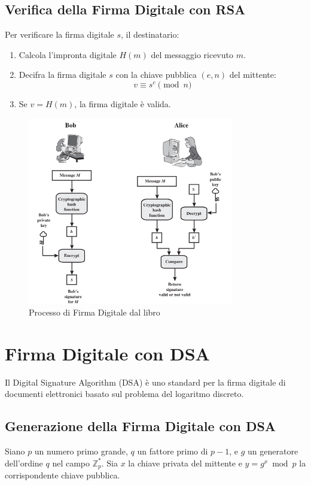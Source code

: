 \documentclass[a4paper,12pt]{report}
\begin{document}
\subsection{Verifica della Firma Digitale con RSA}
Per verificare la firma digitale $s$, il destinatario:

\begin{enumerate}
    \item Calcola l'impronta digitale $H(m)$ del messaggio ricevuto $m$.
    \item Decifra la firma digitale $s$ con la chiave pubblica $(e, n)$ del mittente:
    \[v \equiv s^e \pmod{n}\]
    \item Se $v = H(m)$, la firma digitale è valida.
\end{enumerate}

\begin{figure}[ht]
    \centering
    \includegraphics[width=0.8\textwidth]{img/digital_signature_process.png}
    \caption{Processo di Firma Digitale dal libro \cite{stallings2011cryptography}}
    \label{fig:digital_signature_process}
\end{figure}

\section{Firma Digitale con DSA}
Il Digital Signature Algorithm (DSA) è uno standard per la firma digitale di documenti elettronici basato sul problema del logaritmo discreto.

\subsection{Generazione della Firma Digitale con DSA}
Siano $p$ un numero primo grande, $q$ un fattore primo di $p - 1$, e $g$ un generatore dell'ordine $q$ nel campo $\mathbb{Z}_p^*$. Sia $x$ la chiave privata del mittente e $y = g^x \bmod p$ la corrispondente chiave pubblica.
\end{document}
